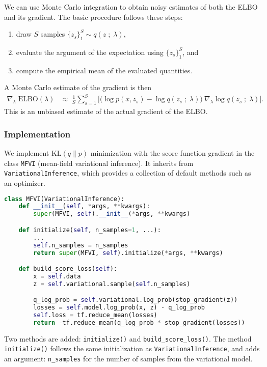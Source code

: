 We can use Monte Carlo integration to obtain noisy estimates of both the ELBO
and its gradient. The basic procedure follows these steps:
\begin{enumerate}
  \item draw $S$ samples $\{z_s\}_1^S \sim q(z\;;\;\lambda)$,
  \item evaluate the argument of the expectation using $\{z_s\}_1^S$, and
  \item compute the empirical mean of the evaluated quantities.
\end{enumerate}

A Monte Carlo estimate of the gradient is then
\begin{align*}
  \nabla_\lambda\;
  \text{ELBO}(\lambda)
  &\approx\;
  \frac{1}{S}
  \sum_{s=1}^{S}
  \big[
  \big(
  \log p(x, z_s)
  -
  \log q(z_s\;;\;\lambda)
  \big)
  \:
  \nabla_\lambda \log q(z_s\;;\;\lambda)
  \big].
\end{align*}
This is an unbiased estimate of the actual gradient of the ELBO.

\subsubsection{Implementation}

We implement $\text{KL}(q\|p)$ minimization with the score function
gradient in the class \texttt{MFVI} (mean-field variational
inference). It inherits from \texttt{VariationalInference}, which
provides a collection of default
methods such as an optimizer.

\begin{lstlisting}[language=Python]
class MFVI(VariationalInference):
    def __init__(self, *args, **kwargs):
        super(MFVI, self).__init__(*args, **kwargs)

    def initialize(self, n_samples=1, ...):
        ...
        self.n_samples = n_samples
        return super(MFVI, self).initialize(*args, **kwargs)

    def build_score_loss(self):
        x = self.data
        z = self.variational.sample(self.n_samples)

        q_log_prob = self.variational.log_prob(stop_gradient(z))
        losses = self.model.log_prob(x, z) - q_log_prob
        self.loss = tf.reduce_mean(losses)
        return -tf.reduce_mean(q_log_prob * stop_gradient(losses))
\end{lstlisting}

Two methods are added: \texttt{initialize()} and
\texttt{build_score_loss()}.  The method \texttt{initialize()} follows
the same initialization as \texttt{VariationalInference}, and adds an
argument: \texttt{n_samples} for the number of samples from the
variational model.

